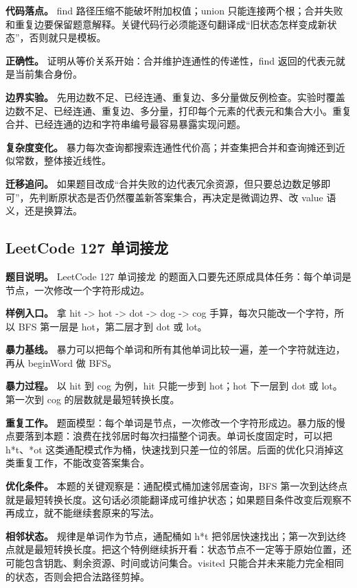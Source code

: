 \textbf{代码落点。} find 路径压缩不能破坏附加权值；union 只能连接两个根；合并失败和重复边要保留题意解释。关键代码行必须能逐句翻译成“旧状态怎样变成新状态”，否则就只是模板。

\textbf{正确性。} 证明从等价关系开始：合并维护连通性的传递性，find 返回的代表元就是当前集合身份。

\textbf{边界实验。} 先用边数不足、已经连通、重复边、多分量做反例检查。实验时覆盖边数不足、已经连通、重复边、多分量，打印每个元素的代表元和集合大小。重复合并、已经连通的边和字符串编号最容易暴露实现问题。

\textbf{复杂度变化。} 暴力每次查询都搜索连通性代价高；并查集把合并和查询摊还到近似常数，整体接近线性。

\textbf{迁移追问。} 如果题目改成“合并失败的边代表冗余资源，但只要总边数足够即可”，先判断原状态是否仍然覆盖新答案集合，再决定是微调边界、改 value 语义，还是换算法。

\subsection{LeetCode 127 单词接龙}

\textbf{题目说明。} LeetCode 127 单词接龙 的题面入口要先还原成具体任务：每个单词是节点，一次修改一个字符形成边。

\textbf{样例入口。} 拿 hit -> hot -> dot -> dog -> cog 手算，每次只能改一个字符，所以 BFS 第一层是 hot，第二层才到 dot 或 lot。

\textbf{暴力基线。} 暴力可以把每个单词和所有其他单词比较一遍，差一个字符就连边，再从 beginWord 做 BFS。

\textbf{暴力过程。} 以 hit 到 cog 为例，hit 只能一步到 hot；hot 下一层到 dot 或 lot。第一次到 cog 的层数就是最短转换长度。

\textbf{重复工作。} 题面模型：每个单词是节点，一次修改一个字符形成边。暴力版的慢点要落到本题：浪费在找邻居时每次扫描整个词表。单词长度固定时，可以把 h*t、*ot 这类通配模式作为桶，快速找到只差一位的邻居。后面的优化只消掉这类重复工作，不能改变答案集合。

\textbf{优化条件。} 本题的关键观察是：通配模式桶加速邻居查询，BFS 第一次到达终点就是最短转换长度。这句话必须能翻译成可维护状态；如果题目条件改变后观察不再成立，就不能继续套原来的写法。

\textbf{相邻状态。} 规律是单词作为节点，通配桶如 h*t 把邻居快速找出；第一次到达终点就是最短转换长度。把这个特例继续拆开看：状态节点不一定等于原始位置，还可能包含钥匙、剩余资源、时间或访问集合。visited 只能合并未来能力完全相同的状态，否则会把合法路径剪掉。

